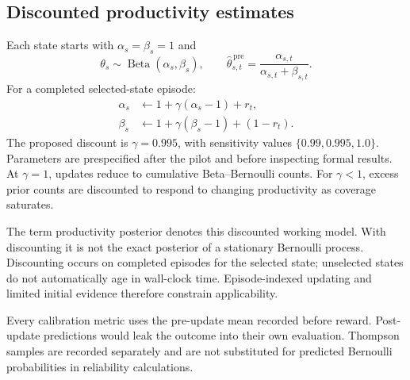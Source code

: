 \documentclass[final,5p,times,number]{elsarticle}
\begin{document}
\subsection{Discounted productivity estimates}
Each state starts with $\alpha_s=\beta_s=1$ and
\begin{equation}
\theta_s\sim\operatorname{Beta}(\alpha_s,\beta_s),\qquad
\widehat{\theta}_{s,t}^{\,\mathrm{pre}}
=\frac{\alpha_{s,t}}{\alpha_{s,t}+\beta_{s,t}}.
\end{equation}
For a completed selected-state episode:
\begin{align}
\alpha_s&\leftarrow1+\gamma(\alpha_s-1)+r_t,\\
\beta_s&\leftarrow1+\gamma(\beta_s-1)+(1-r_t).
\label{eq:update}
\end{align}
The proposed discount is $\gamma=0.995$, with sensitivity values $\{0.99,0.995,1.0\}$. Parameters are prespecified after the pilot and before inspecting formal results. At $\gamma=1$, updates reduce to cumulative Beta--Bernoulli counts. For $\gamma<1$, excess prior counts are discounted to respond to changing productivity as coverage saturates.

The term productivity posterior denotes this discounted working model. With discounting it is not the exact posterior of a stationary Bernoulli process. Discounting occurs on completed episodes for the selected state; unselected states do not automatically age in wall-clock time. Episode-indexed updating and limited initial evidence therefore constrain applicability.

Every calibration metric uses the pre-update mean recorded before reward. Post-update predictions would leak the outcome into their own evaluation. Thompson samples are recorded separately and are not substituted for predicted Bernoulli probabilities in reliability calculations.
\end{document}
